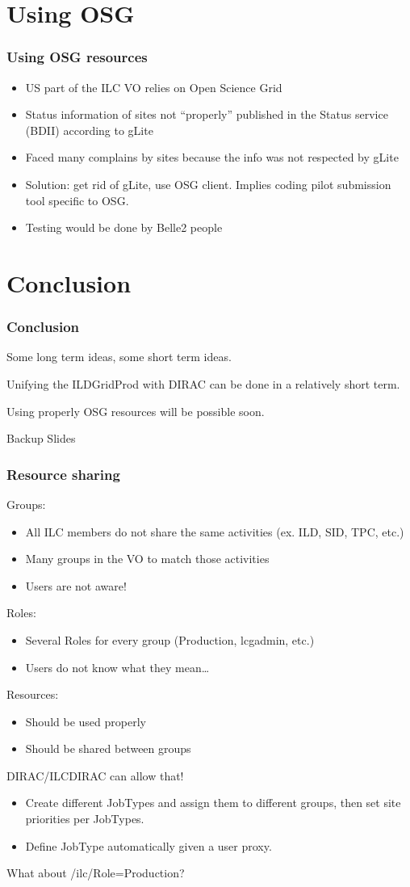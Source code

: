 \documentclass[10pt,table,dvipsnames]{beamer}
\newcommand{\interstitial}[1]{\begin{frame}\begin{block}{}\centering\Huge{#1}\end{block} \end{frame}}
\newcommand{\backupslides}{\interstitial{Backup Slides}}
\begin{document}
\section{Using OSG}
\label{sec:osg}

\begin{frame}
  \frametitle{Using OSG resources}
  \begin{itemize}
  \item US part of the ILC VO relies on Open Science Grid
  \item Status information of sites not ``properly'' published in the Status service (BDII) according to gLite
  \item Faced many complains by sites because the info was not respected by gLite
  \item Solution: get rid of gLite, use OSG client. Implies coding pilot submission tool specific to OSG.
  \item Testing would be done by Belle2 people
  \end{itemize}
\end{frame}

\section{Conclusion}
\label{sec:conc}
\begin{frame}
  \frametitle{Conclusion}
Some long term ideas, some short term ideas. 

Unifying the ILDGridProd with DIRAC can be done in a relatively short term.

Using properly OSG resources will be possible soon.
\label{lastframe}
\end{frame}

\backupslides
\begin{frame}
  \frametitle{Resource sharing}
Groups:
  \begin{itemize}
  \item All ILC members do not share the same activities (ex. ILD, SID, TPC, etc.)
  \item Many groups in the VO to match those activities
  \item Users are not aware!
  \end{itemize}
Roles:
\begin{itemize}
\item Several Roles for every group (Production, lcgadmin, etc.)
\item Users do not know what they mean\ldots
\end{itemize}
Resources:
\begin{itemize}
\item Should be used properly
\item Should be shared between groups
\end{itemize}
DIRAC/ILCDIRAC can allow that!
\begin{itemize}
\item Create different JobTypes and assign them to different groups, then set site priorities per JobTypes.
\item Define JobType automatically given a user proxy.
\end{itemize}
\alert{What about /ilc/Role=Production?}
\end{frame}
\end{document}
